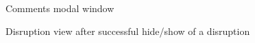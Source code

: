 \begin{figure}[ht!]
	\caption{Comments modal window}
\label{fig:ui6}
\end{figure}

\begin{figure}[ht!]
	\caption{Disruption view after successful hide/show of a disruption}
\label{fig:ui7}
\end{figure}

